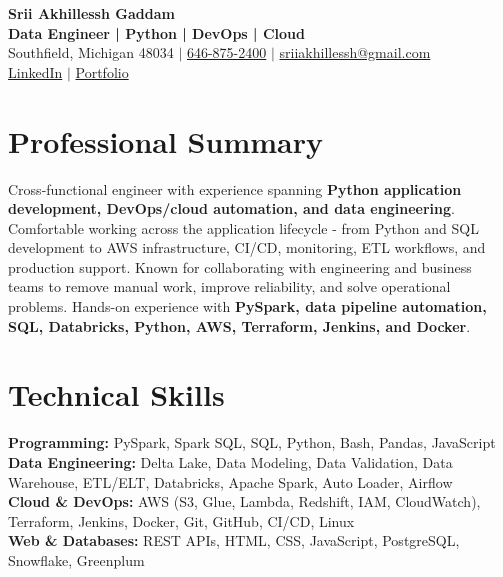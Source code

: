 \documentclass[letterpaper,10pt]{article}
\begin{document}
\fontsize{9.35pt}{10.45pt}\selectfont

\begin{center}
    {\LARGE \textbf{Srii Akhillessh Gaddam}} \\[-1pt]
    \textbf{Data Engineer | Python | DevOps | Cloud} \\[2pt]
    Southfield, Michigan 48034 $|$
    \href{tel:6468752400}{646-875-2400} $|$
    \href{mailto:sriiakhillessh@gmail.com}{sriiakhillessh@gmail.com} \\[1pt]
    \href{https://www.linkedin.com/in/srii-akhiilessh-gaddam-b48668191/}{LinkedIn} $|$
    \href{https://sriiakhillesshg.github.io/portfolio/}{Portfolio}
\end{center}
\vspace{-8pt}

\section{Professional Summary}
\small{Cross-functional engineer with experience spanning \textbf{Python application development, DevOps/cloud automation, and data engineering}. Comfortable working across the application lifecycle - from Python and SQL development to AWS infrastructure, CI/CD, monitoring, ETL workflows, and production support. Known for collaborating with engineering and business teams to remove manual work, improve reliability, and solve operational problems. Hands-on experience with \textbf{PySpark, data pipeline automation, SQL, Databricks, Python, AWS, Terraform, Jenkins, and Docker}.}

\section{Technical Skills}
\small{
\textbf{Programming:} PySpark, Spark SQL, SQL, Python, Bash, Pandas, JavaScript \\
\textbf{Data Engineering:} Delta Lake, Data Modeling, Data Validation, Data Warehouse, ETL/ELT, Databricks, Apache Spark, Auto Loader, Airflow \\
\textbf{Cloud \& DevOps:} AWS (S3, Glue, Lambda, Redshift, IAM, CloudWatch), Terraform, Jenkins, Docker, Git, GitHub, CI/CD, Linux \\
\textbf{Web \& Databases:} REST APIs, HTML, CSS, JavaScript, PostgreSQL, Snowflake, Greenplum
}
\end{document}
